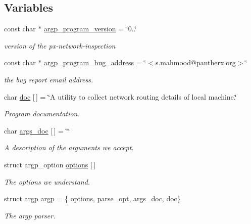 \subsection*{Variables}
\begin{DoxyCompactItemize}
\item 
const char $\ast$ \hyperlink{arg-info_8h_a62f73ea01c816f1996aed4c66f57c4fb}{argp\+\_\+program\+\_\+version} = \char`\"{}0..\char`\"{}
\begin{DoxyCompactList}\small\item\em version of the px-\/network-\/inspection \end{DoxyCompactList}\item 
const char $\ast$ \hyperlink{arg-info_8h_aaa037e59f26a80a8a2e35e6f2364004d}{argp\+\_\+program\+\_\+bug\+\_\+address} = \char`\"{}$<$s.\+mahmood@pantherx.\+org$>$\char`\"{}
\begin{DoxyCompactList}\small\item\em the bug report email address. \end{DoxyCompactList}\item 
char \hyperlink{arg-info_8h_af6164deb8a824f8cb2b9147cfc3174f5}{doc} \mbox{[}$\,$\mbox{]} = \char`\"{}A utility to collect network routing details of local machine.\char`\"{}
\begin{DoxyCompactList}\small\item\em Program documentation. \end{DoxyCompactList}\item 
char \hyperlink{arg-info_8h_a91b08784b3668a8a1fbe2eec1947fb9d}{args\+\_\+doc} \mbox{[}$\,$\mbox{]} = \char`\"{}\char`\"{}
\begin{DoxyCompactList}\small\item\em A description of the arguments we accept. \end{DoxyCompactList}\item 
struct argp\+\_\+option \hyperlink{arg-info_8h_abc1fd3a47aea6a8944038c9100eb9135}{options} \mbox{[}$\,$\mbox{]}
\begin{DoxyCompactList}\small\item\em The options we understand. \end{DoxyCompactList}\item 
struct argp \hyperlink{arg-info_8h_ab70c96531b1b652d70c221cfaf3207f3}{argp} = \{ \hyperlink{arg-info_8h_abc1fd3a47aea6a8944038c9100eb9135}{options}, \hyperlink{arg-info_8h_a5fb6abc38ef248ec154591e0dd392c1b}{parse\+\_\+opt}, \hyperlink{arg-info_8h_a91b08784b3668a8a1fbe2eec1947fb9d}{args\+\_\+doc}, \hyperlink{arg-info_8h_af6164deb8a824f8cb2b9147cfc3174f5}{doc}\}
\begin{DoxyCompactList}\small\item\em The argp parser. \end{DoxyCompactList}\end{DoxyCompactItemize}


